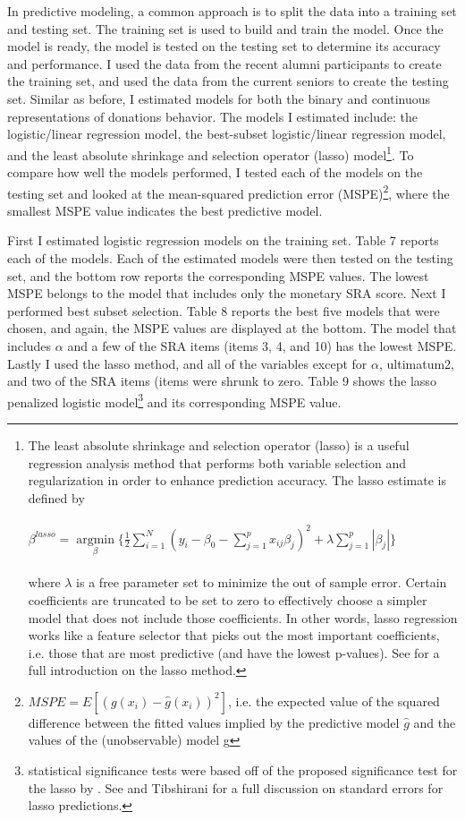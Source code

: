 \documentclass[12pt]{article}
\begin{document}
In predictive modeling, a common approach is to split the data into a training set and testing set. The training set is used to build and train the model. Once the model is ready, the model is tested on the testing set to determine its accuracy and performance. I used the data from the recent alumni participants to create the training set, and used the data from the current seniors to create the testing set. Similar as before, I estimated models for both the binary and continuous representations of donations behavior. The models I estimated include: the logistic/linear regression model, the best-subset logistic/linear regression model, and the least absolute shrinkage and selection operator (lasso) model\footnote{The least absolute shrinkage and selection operator (lasso) is a useful regression analysis method that performs both variable selection and regularization in order to enhance prediction accuracy. The lasso estimate is defined by\\ \\
\( \beta^{lasso}=\mathop\mathrm{argmin}\limits_{\beta} \{ \frac{1}{2} \sum_{i=1}^{N} (y_{i} - \beta_{0} - \sum_{j=1}^{p}x_{ij}\beta _{j})^{2}+\lambda\sum_{j=1}^{p}|\beta _{j}|\} \) \\ \\
where \(\lambda\) is a free parameter set to minimize the out of sample error. Certain coefficients are truncated to be set to zero to effectively choose a simpler model that does not include those coefficients. In other words, lasso regression works like a feature selector that picks out the most important coefficients, i.e. those that are most predictive (and have the lowest p-values). See \cite{tibshirani_1996} for a full introduction on the lasso method.}. To compare how well the models performed, I tested each of the models on the testing set and looked at the mean-squared prediction error (MSPE)\footnote{\(MSPE = E[(g(x_{i}) - \hat{g}(x_{i}))^{2}]\), i.e. the expected value of the squared difference between the fitted values implied by the predictive model \(\hat{g}\) and the values of the (unobservable) model g}, where the smallest MSPE value indicates the best predictive model.

First I estimated logistic regression models on the training set. Table 7 reports each of the models. Each of the estimated models were then tested on the testing set, and the bottom row reports the corresponding MSPE values. The lowest MSPE belongs to the model that includes only the monetary SRA score. Next I performed best subset selection. Table 8 reports the best five models that were chosen, and again, the MSPE values are displayed at the bottom. The model that includes \(\alpha\) and a few of the SRA items (items 3, 4, and 10) has the lowest MSPE. Lastly I used the lasso method, and all of the variables except for \(\alpha\), ultimatum2, and two of the SRA items (items were shrunk to zero. Table 9 shows the lasso penalized logistic model\footnote{statistical significance tests were based off of the proposed significance test for the lasso by \cite{lockhart_2014}. See \cite{kyung_2010} and Tibshirani for a full discussion on standard errors for lasso predictions.} and its corresponding MSPE value.
\end{document}
